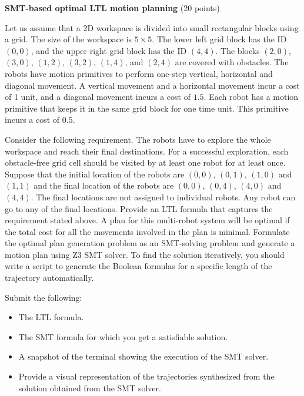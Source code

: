 \documentclass[a4paper, 12pt]{article}
\begin{document}
\begin{problem} {\textbf{SMT-based optimal LTL motion planning}} (20 points)

\bigskip
Let us assume that a 2D workspace is divided into small rectangular blocks using a grid. 
The size of the workspace is $5 \times 5$. The lower left grid block has the ID $(0,0)$, and 
the upper right grid block has the ID $(4,4)$. The blocks $(2,0)$, $(3,0)$, $(1,2)$, $(3,2)$, $(1,4)$, and $(2,4)$ are covered with obstacles.
The robots have motion primitives to perform one-step vertical, horizontal and diagonal movement. A vertical movement and a horizontal movement incur a cost of 1 unit, and a diagonal movement incurs a cost of $1.5$. Each robot has a motion primitive that keeps it in the same grid block for one time unit. 
This primitive incurs a cost of $0.5$.

Consider the following requirement. The robots have to explore the whole workspace and reach their final destinations. 
For a successful exploration, each obstacle-free grid cell should be visited by at least one robot for at least once. Suppose
that the initial location of the robots are $(0,0)$, $(0,1)$, $(1,0)$ and $(1,1)$ and the final location of the robots are $(0,0)$, $(0,4)$, $(4,0)$ and $(4,4)$.
The final locations are not assigned to individual robots. Any robot can go to any of the final locations.
Provide an LTL formula that captures the requirement stated above. 
A plan for this multi-robot system will be optimal if the total cost for all the movements involved in the plan is minimal.
Formulate the optimal plan generation problem as an SMT-solving problem and generate a motion plan using Z3 SMT solver.
To find the solution iteratively, you should write a script to generate the Boolean formulas for a specific length 
of the trajectory automatically.


\bigskip
\noindent
Submit the following:
\begin{itemize}
\item The LTL formula.
\item The SMT formula for which you get a satisfiable solution.
\item A snapshot of the terminal showing the execution of the SMT solver.
\item Provide a visual representation of the trajectories synthesized from the solution obtained from the SMT solver.
\end{itemize}


\end{problem}
\end{document}
